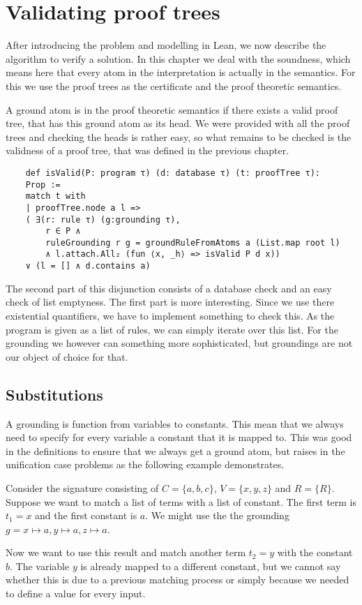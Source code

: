 \section{Validating proof trees}

After introducing the problem and modelling in Lean, we now describe the algorithm to verify a solution. In this chapter we deal with the soundness, which means here that every atom in the interpretation is actually in the semantics. For this we use the proof trees as the certificate and the proof theoretic semantics.

A ground atom is in the proof theoretic semantics if there exists a valid proof tree, that has this ground atom as its head. We were provided with all the proof trees and checking the heads is rather easy, so what remains to be checked is the validness of a proof tree, that was defined in the previous chapter.

\begin{lstlisting}
    def isValid(P: program τ) (d: database τ) (t: proofTree τ): 
    Prop :=
    match t with
    | proofTree.node a l => 
    ( ∃(r: rule τ) (g:grounding τ), 
        r ∈ P ∧ 
        ruleGrounding r g = groundRuleFromAtoms a (List.map root l)
        ∧ l.attach.All₂ (fun ⟨x, _h⟩ => isValid P d x)) 
    ∨ (l = [] ∧ d.contains a)
\end{lstlisting}

The second part of this disjunction consists of a database check and an easy check of list emptyness. The first part is more interesting. Since we use there existential quantifiers, we have to implement something to check this. As the program is given as a list of rules, we can simply iterate over this list. For the grounding we however can something more sophisticated, but groundings are not our object of choice for that.


\subsection{Substitutions}
    A grounding is function from variables to constants. This mean that we always need to specify for every variable a constant that it is mapped to. This was good in the definitions to ensure that we always get a ground atom, but raises in the unification case problems as the following example demonstrates.

    \begin{example}
        Consider the signature consisting of $C = \{a,b,c\}$, $V = \{x,y,z \}$ and $R = \{R\}$. Suppose we want to match a list of terms with a list of constant. The first term is $t_1 = x$ and the first constant is $a$. We might use the the grounding $g = x \mapsto a, y \mapsto a, z \mapsto a$.

        Now we want to use this result and match another term $t_2 = y$ with the constant $b$. The variable $y$ is already mapped to a different constant, but we cannot say whether this is due to a previous matching process or simply because we needed to define a value for every input.
        

        
    \end{example}

